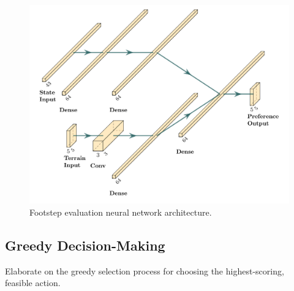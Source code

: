 \begin{figure}
  \centering
  \includegraphics[width=0.5\linewidth]{images/diagrams/nn-architecture.png}
  \caption{Footstep evaluation neural network architecture.}
  \label{fig:diagram-nn-architecture}
\end{figure}

\subsection{Greedy Decision-Making}

\begin{outline}
  Elaborate on the greedy selection process for choosing the highest-scoring, feasible action.
\end{outline}

